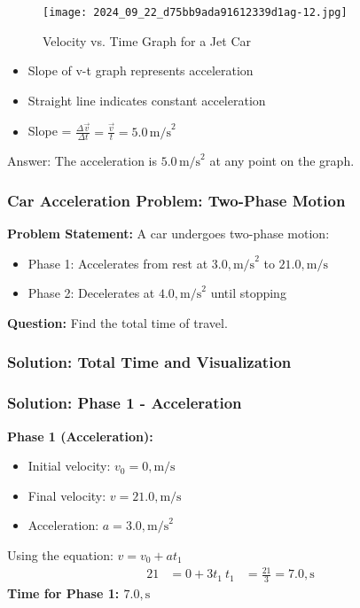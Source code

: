 \documentclass{beamer}
\begin{document}
\begin{frame}
\begin{figure}[H]
    \centering
    \texttt{[image: 2024\_09\_22\_d75bb9ada91612339d1ag-12.jpg]}
\caption{Velocity vs. Time Graph for a Jet Car}
\end{figure}
\begin{itemize}
    \item Slope of v-t graph represents acceleration
    \item Straight line indicates constant acceleration
    \item Slope = $\frac{\Delta \vec{v}}{\Delta t} = \frac{\vec{v}}{t} = 5.0 \, \text{m/s}^2$
\end{itemize}

Answer: The acceleration is $5.0 \, \text{m/s}^2$ at any point on the graph.
\end{frame}
\begin{frame}
\frametitle{Car Acceleration Problem: Two-Phase Motion}
\textbf{Problem Statement:}
A car undergoes two-phase motion:
\begin{itemize}
\item Phase 1: Accelerates from rest at $3.0 , \text{m/s}^2$ to $21.0 , \text{m/s}$
\item Phase 2: Decelerates at $4.0 , \text{m/s}^2$ until stopping
\end{itemize}
\vspace{0.5cm}
\textbf{Question:} Find the total time of travel.
\end{frame}
\begin{frame}
\frametitle{Solution: Total Time and Visualization}
\end{frame}
\begin{frame}
\frametitle{Solution: Phase 1 - Acceleration}
\textbf{Phase 1 (Acceleration):}
\begin{itemize}
\item Initial velocity: $v_0 = 0 , \text{m/s}$
\item Final velocity: $v = 21.0 , \text{m/s}$
\item Acceleration: $a = 3.0 , \text{m/s}^2$
\end{itemize}
Using the equation: $v = v_0 + at_1$
\begin{align*}
21 &= 0 + 3t_1 \
t_1 &= \frac{21}{3} = 7.0 , \text{s}
\end{align*}
\textbf{Time for Phase 1: $7.0 , \text{s}$}
\end{frame}
\end{document}
